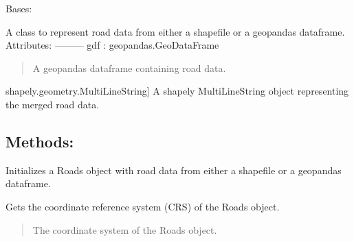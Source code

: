 \documentclass[letterpaper,10pt,english]{sphinxmanual}
\begin{document}

\begin{fulllineitems}
\label{\detokenize{pysewer:pysewer.preprocessing.Roads}}
\pysigstartsignatures
{}
\pysigstopsignatures
\sphinxAtStartPar
Bases: 

\sphinxAtStartPar
A class to represent road data from either a shapefile or a geopandas dataframe.
Attributes:
———\sphinxhyphen{}
gdf : geopandas.GeoDataFrame
\begin{quote}

\sphinxAtStartPar
A geopandas dataframe containing road data.
\end{quote}
\begin{description}
\sphinxlineitem{merged\_roads}{[}shapely.geometry.MultiLineString{]}
\sphinxAtStartPar
A shapely MultiLineString object representing the merged road data.

\end{description}


\subsection{Methods:}
\label{\detokenize{pysewer:methods}}\begin{description}
\sphinxAtStartPar
Initializes a Roads object with road data from either a shapefile or a geopandas dataframe.

\end{description}

\begin{fulllineitems}
\label{\detokenize{pysewer:pysewer.preprocessing.Roads.get_crs}}
\pysigstartsignatures
{}
\pysigstopsignatures
\sphinxAtStartPar
Gets the coordinate reference system (CRS) of the Roads object.
\begin{quote}\begin{description}
\sphinxAtStartPar
The coordinate system of the Roads object.


\end{description}
\end{quote}
\end{fulllineitems}
\end{fulllineitems}
\end{document}
